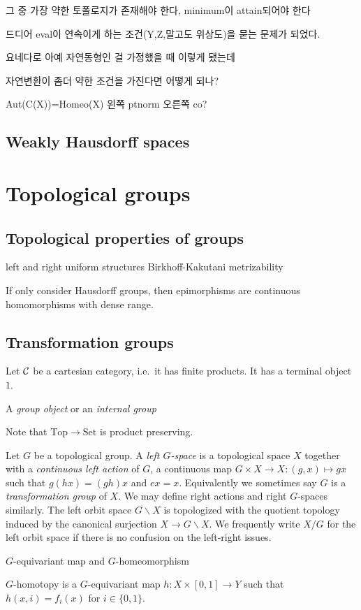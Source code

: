 \documentclass{../../large}
\begin{document}
그 중 가장 약한 토폴로지가 존재해야 한다, minimum이 attain되어야 한다

드디어 eval이 연속이게 하는 조건(Y,Z,말고도 위상도)을 묻는 문제가 되었다.

요네다로 아예 자연동형인 걸 가정했을 때 이렇게 됐는데

자연변환이 좀더 약한 조건을 가진다면 어떻게 되나?

Aut(C(X))=Homeo(X) 왼쪽 ptnorm 오른쪽 co?

\fi






\section{Weakly Hausdorff spaces}




\chapter{Topological groups}

\section{Topological properties of groups}
left and right uniform structures
Birkhoff-Kakutani
metrizability


If only consider Hausdorff groups, then epimorphisms are continuous homomorphisms with dense range.

\section{Transformation groups}

Let $\mathcal{C}$ be a cartesian category, i.e.~it has finite products.
It has a terminal object $1$.

A \emph{group object} or an \emph{internal group} 

Note that $\mathrm{Top}\to\mathrm{Set}$ is product preserving.



\begin{prb}
Let $G$ be a topological group.
A \emph{left $G$-space} is a topological space $X$ together with a \emph{continuous left action} of $G$, a continuous map $G\times X\to X:(g,x)\mapsto gx$ such that $g(hx)=(gh)x$ and $ex=x$.
Equivalently we sometimes say $G$ is a \emph{transformation group} of $X$.
We may define right actions and right $G$-spaces similarly.
The left orbit space $G\backslash X$ is topologized with the quotient topology induced by the canonical surjection $X\to G\backslash X$.
We frequently write $X/G$ for the left orbit space if there is no confusion on the left-right issues.

$G$-equivariant map and $G$-homeomorphism

$G$-homotopy is a $G$-equivariant map $h:X\times[0,1]\to Y$ such that $h(x,i)=f_i(x)$ for $i\in\{0,1\}$.
\end{prb}
\end{document}
